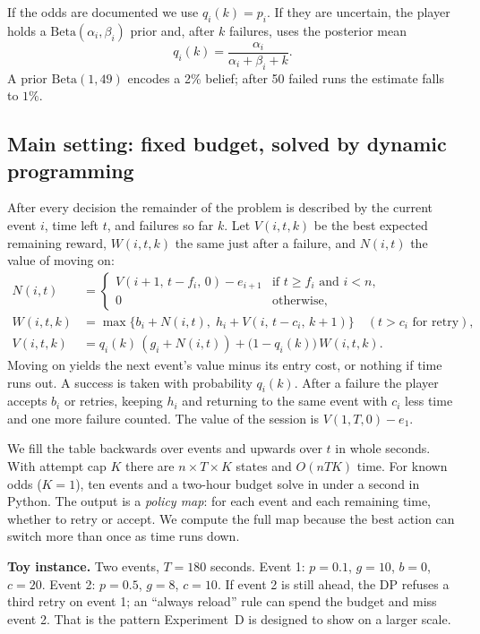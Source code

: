 \documentclass[11pt,a4paper]{article}
\begin{document}
If the odds are documented we use \(q_i(k) = p_i\). If they are uncertain, the player holds a \(\mathrm{Beta}(\alpha_i,\beta_i)\) prior and, after \(k\) failures, uses the posterior mean
\[
q_i(k) = \frac{\alpha_i}{\alpha_i + \beta_i + k}.
\]
A prior \(\mathrm{Beta}(1,49)\) encodes a 2\% belief; after 50 failed runs the estimate falls to \(1\%\).

\subsection{Main setting: fixed budget, solved by dynamic programming}
\label{sec:dp}
After every decision the remainder of the problem is described by the current event \(i\), time left \(t\), and failures so far \(k\). Let \(V(i,t,k)\) be the best expected remaining reward, \(W(i,t,k)\) the same just after a failure, and \(N(i,t)\) the value of moving on:
\begin{align}
N(i,t)
&=
\begin{cases}
V(i+1,\, t-f_i,\, 0) - e_{i+1}
& \text{if } t \ge f_i \text{ and } i < n,\\
0 & \text{otherwise,}
\end{cases}
\label{eq:N}\\[0.35em]
W(i,t,k)
&=
\max\bigl\{
b_i + N(i,t),\;
h_i + V(i,\, t-c_i,\, k+1)
\bigr\}
\quad (t > c_i \text{ for retry}),
\label{eq:W}\\[0.35em]
V(i,t,k)
&=
q_i(k)\,(g_i + N(i,t))
+ \bigl(1-q_i(k)\bigr)\, W(i,t,k).
\label{eq:V}
\end{align}
Moving on yields the next event's value minus its entry cost, or nothing if time runs out. A success is taken with probability \(q_i(k)\). After a failure the player accepts \(b_i\) or retries, keeping \(h_i\) and returning to the same event with \(c_i\) less time and one more failure counted. The value of the session is \(V(1,T,0) - e_1\).

We fill the table backwards over events and upwards over \(t\) in whole seconds. With attempt cap \(K\) there are \(n \times T \times K\) states and \(O(nTK)\) time. For known odds (\(K=1\)), ten events and a two-hour budget solve in under a second in Python. The output is a \emph{policy map}: for each event and each remaining time, whether to retry or accept. We compute the full map because the best action can switch more than once as time runs down.

\textbf{Toy instance.}
Two events, \(T = 180\) seconds. Event 1: \(p=0.1\), \(g=10\), \(b=0\), \(c=20\). Event 2: \(p=0.5\), \(g=8\), \(c=10\). If event 2 is still ahead, the DP refuses a third retry on event 1; an ``always reload'' rule can spend the budget and miss event 2. That is the pattern Experiment~D is designed to show on a larger scale.
\end{document}
